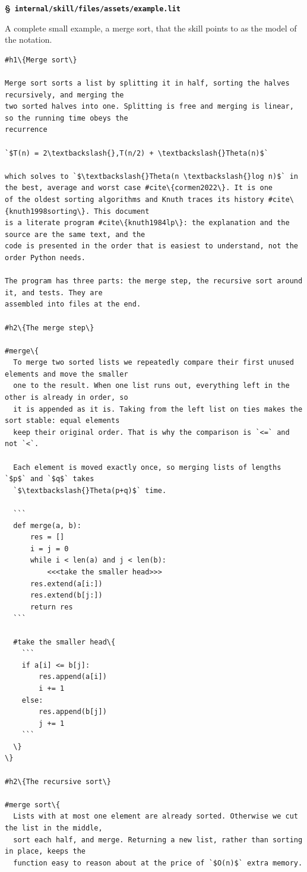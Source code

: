 \documentclass[10pt,a4paper]{article}
\newcounter{chunk}
\renewcommand{\thechunk}{\S\arabic{chunk}}
\newcommand{\chunkhead}[2]{\par\addvspace{1.2ex}\noindent\refstepcounter{chunk}\label{#1}{\bfseries\thechunk}\enspace #2\par\nopagebreak}
\newcommand{\filebadge}{{\footnotesize\itshape\color{tuftegray}file}}
\begin{document}
\chunkhead{chunk285}{\filebadge\ \textbf{\texttt{internal/\allowbreak{}skill/\allowbreak{}files/\allowbreak{}assets/\allowbreak{}example.\allowbreak{}lit}}}
A complete small example, a merge sort, that the skill points to as the model of the notation.
\begin{Verbatim}
#h1\{Merge sort\}

Merge sort sorts a list by splitting it in half, sorting the halves recursively, and merging the
two sorted halves into one. Splitting is free and merging is linear, so the running time obeys the
recurrence

`$T(n) = 2\textbackslash{},T(n/2) + \textbackslash{}Theta(n)$`

which solves to `$\textbackslash{}Theta(n \textbackslash{}log n)$` in the best, average and worst case #cite\{cormen2022\}. It is one
of the oldest sorting algorithms and Knuth traces its history #cite\{knuth1998sorting\}. This document
is a literate program #cite\{knuth1984lp\}: the explanation and the source are the same text, and the
code is presented in the order that is easiest to understand, not the order Python needs.

The program has three parts: the merge step, the recursive sort around it, and tests. They are
assembled into files at the end.

#h2\{The merge step\}

#merge\{
  To merge two sorted lists we repeatedly compare their first unused elements and move the smaller
  one to the result. When one list runs out, everything left in the other is already in order, so
  it is appended as it is. Taking from the left list on ties makes the sort stable: equal elements
  keep their original order. That is why the comparison is `<=` and not `<`.

  Each element is moved exactly once, so merging lists of lengths `$p$` and `$q$` takes
  `$\textbackslash{}Theta(p+q)$` time.

  ```
  def merge(a, b):
      res = []
      i = j = 0
      while i < len(a) and j < len(b):
          <<<take the smaller head>>>
      res.extend(a[i:])
      res.extend(b[j:])
      return res
  ```

  #take the smaller head\{
    ```
    if a[i] <= b[j]:
        res.append(a[i])
        i += 1
    else:
        res.append(b[j])
        j += 1
    ```
  \}
\}

#h2\{The recursive sort\}

#merge sort\{
  Lists with at most one element are already sorted. Otherwise we cut the list in the middle,
  sort each half, and merge. Returning a new list, rather than sorting in place, keeps the
  function easy to reason about at the price of `$O(n)$` extra memory.


\end{Verbatim}
\end{document}
